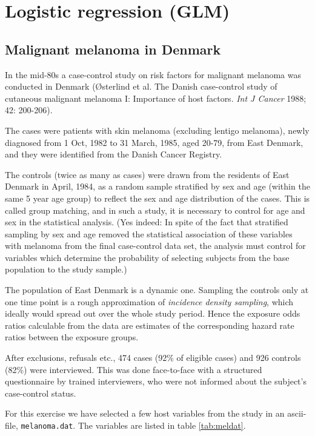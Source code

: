 

\section{Logistic regression (GLM)}

\subsection{Malignant melanoma in Denmark}

In the mid-80s a case-control study on
risk factors for malignant melanoma was conducted in Denmark
({\O}sterlind et al. The Danish case-control study of cutaneous
malignant melanoma I: Importance of host factors.
 \emph{Int J Cancer} 1988; 42: 200-206).


The cases were patients with skin melanoma
(excluding lentigo melanoma),
newly diagnosed from 1 Oct, 1982 to 31 March, 1985, aged 20-79, from 
East Denmark, and they were identified from the Danish Cancer Registry.

The controls (twice as many as cases) 
were drawn from the residents of East Denmark
in April, 1984, as a random sample stratified by
sex and age (within the same 5 year age group) to reflect the 
sex and age distribution of the cases. This is called group matching,
and in such a study, it is necessary to control for age and sex in the statistical analysis. 
(Yes indeed: In spite of the fact that
stratified sampling by sex and age removed the statistical association of these
variables with melanoma from the final case-control data set,
 the analysis must control for
variables which determine the probability of selecting 
 subjects from the base population to the study sample.)
 
The population of East Denmark is a dynamic one. Sampling the
controls only at one time point is a rough approximation of
{\it incidence density sampling}, which ideally would spread out over the whole study period. Hence
the exposure odds ratios calculable from the data are estimates
of the corresponding hazard rate ratios between the exposure groups. 

After exclusions, refusals etc., 
474 cases (92\% of eligible cases) 
and 926 controls (82\%) were interviewed. This was done face-to-face
with a structured questionnaire
by trained interviewers, who were not 
informed about the subject's case-control status.

For this  exercise we have selected a few host variables from the
study in an ascii-file, \texttt{melanoma.dat}. The variables are listed
in table \ref{tab:meldat}.

